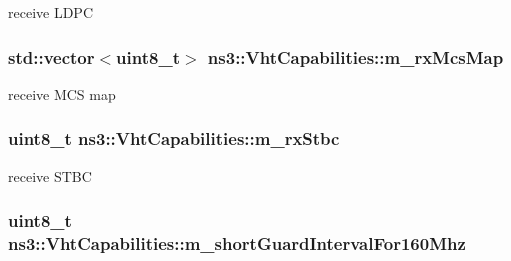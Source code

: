 receive L\+D\+PC 

\subsubsection[{\texorpdfstring{m\+\_\+rx\+Mcs\+Map}{m_rxMcsMap}}]{\setlength{\rightskip}{0pt plus 5cm}std\+::vector$<$uint8\+\_\+t$>$ ns3\+::\+Vht\+Capabilities\+::m\+\_\+rx\+Mcs\+Map\hspace{0.3cm}{\ttfamily [private]}}\hypertarget{classns3_1_1VhtCapabilities_aab864873031d3831d142b627d91c1e85}{}\label{classns3_1_1VhtCapabilities_aab864873031d3831d142b627d91c1e85}


receive M\+CS map 

\subsubsection[{\texorpdfstring{m\+\_\+rx\+Stbc}{m_rxStbc}}]{\setlength{\rightskip}{0pt plus 5cm}uint8\+\_\+t ns3\+::\+Vht\+Capabilities\+::m\+\_\+rx\+Stbc\hspace{0.3cm}{\ttfamily [private]}}\hypertarget{classns3_1_1VhtCapabilities_a6dccb436c32dda6ccbdbaf67928cdece}{}\label{classns3_1_1VhtCapabilities_a6dccb436c32dda6ccbdbaf67928cdece}


receive S\+T\+BC 

\subsubsection[{\texorpdfstring{m\+\_\+short\+Guard\+Interval\+For160\+Mhz}{m_shortGuardIntervalFor160Mhz}}]{\setlength{\rightskip}{0pt plus 5cm}uint8\+\_\+t ns3\+::\+Vht\+Capabilities\+::m\+\_\+short\+Guard\+Interval\+For160\+Mhz\hspace{0.3cm}{\ttfamily [private]}}\hypertarget{classns3_1_1VhtCapabilities_aaaba1407325ab2e1eb5d0a063058e6e4}{}\label{classns3_1_1VhtCapabilities_aaaba1407325ab2e1eb5d0a063058e6e4}


